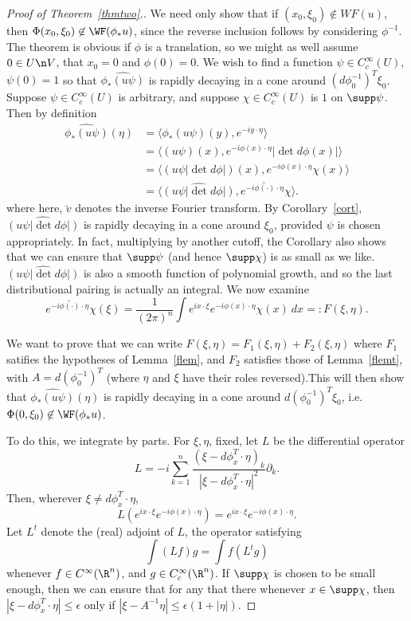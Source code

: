 \documentclass[12pt]{article}
\begin{document}
\begin{proof}[Proof of Theorem~\ref{thmtwo}.]We need only show that if $(x_0,\xi_0) \not \in WF(u)$, then $\Phi(x_0,\xi_0) \not \in \WF(\phi_{\ast}u)$, since the reverse inclusion follows by considering $\phi^{-1}$. The theorem is obvious if $\phi$ is a translation, so we might as well assume $0 \in U\n V$, that $x_0 = 0$ and $\phi(0) = 0$. We wish to find a function $\psi \in C_c^\infty(U)$, $\psi(0) = 1$ so that
$\widehat{\phi_{\ast}(u\psi)}$ is rapidly decaying in a cone around $(d\phi^{-1}_0)^T\xi_0$. Suppose $\psi \in C_c^\infty(U)$ is arbitrary, and suppose $\chi \in C_c^\infty(U)$ is $1$ on $\supp \psi$. Then by definition
\begin{align*}\widehat{\phi_{\ast}(u\psi)}(\eta) &= \langle \phi_{\ast}(u\psi)(y),e^{-iy\cdot \eta}\rangle\\
&= \langle (u\psi)(x),e^{-i\phi(x)\cdot \eta}|\det d\phi(x)|\rangle\\
&= \langle (u\psi|\det d\phi|)(x),e^{-i\phi(x)\cdot \eta}\chi(x)\rangle\\
&= \langle \widehat{(u\psi|\det d\phi|)},\breve{e^{-i\phi(\cdot)\cdot \eta}\chi}\rangle.\end{align*}
where here, $\breve{v}$ denotes the inverse Fourier transform.
By Corollary~\ref{cort}, $\widehat{(u\psi|\det d\phi|)}$ is rapidly decaying in a cone around $\xi_0$, provided $\psi$ is chosen appropriately. In fact, multiplying by another cutoff, the Corollary also shows that we can ensure that $\supp \psi$ (and hence $\supp \chi$) is as small as we like. $\widehat{(u\psi|\det d\phi|)}$ is also a smooth function of polynomial growth, and so the last distributional pairing is actually an integral. We now examine
\[\breve{e^{-i\phi(\cdot)\cdot \eta}\chi}(\xi) = \frac{1}{(2\pi)^n}\int e^{ix\cdot \xi}e^{-i\phi(x)\cdot \eta}\chi(x)\ dx =: F(\xi,\eta).\]

We want to prove that we can write $F(\xi,\eta) = F_1(\xi,\eta) + F_2(\xi,\eta)$ where $F_1$ satifies the hypotheses of Lemma~\ref{flem}, and $F_2$ satisfies those of Lemma~\ref{flemt}, with $A = d(\phi^{-1}_0)^T$ (where $\eta$ and $\xi$ have their roles reversed).This will then show that
$\widehat{\phi_{\ast}(u\psi)}(\eta)$ is rapidly decaying in a cone around $d(\phi^{-1}_0)^T\xi_0$, i.e. $\Phi(0,\xi_0) \not \in \WF(\phi_{\ast}u)$.

To do this, we integrate by parts. For $\xi,\eta$, fixed, let $L$ be the differential operator
\[L = -i\sum_{k=1}^n \frac{(\xi-d\phi_x^T\cdot \eta)_k}{|\xi-d\phi_x^T\cdot \eta|^2}\partial_k.\]
Then, wherever $\xi \neq d\phi_x^T\cdot \eta$,
\[L(e^{ix\cdot \xi}e^{-i\phi(x)\cdot \eta}) = e^{ix\cdot \xi}e^{-i\phi(x)\cdot \eta}.\] Let $L^t$ denote the (real) adjoint of $L$, the operator satisfying
\[\int (Lf)g = \int f(L^tg)\] whenever $f \in C^\infty(\R^n)$, and $g \in C_c^\infty(\R^n)$. If $\supp \chi$ is chosen to be small enough, then we can ensure that for any that there whenever $x \in \supp \chi$, then $|\xi - d\phi_x^T\cdot \eta| \leq \epsilon$ only if $|\xi-A^{-1}\eta| \leq \epsilon(1+|\eta|)$.


\end{proof}
\end{document}

